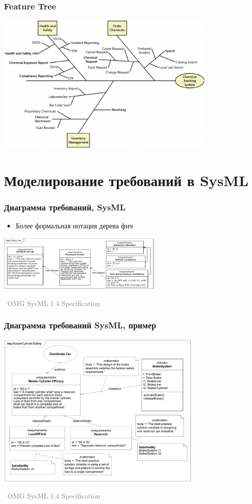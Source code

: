 \documentclass[xetex,mathserif,serif]{beamer}
\newcommand{\attribution}[1] {
	\vspace{-5mm}\begin{flushright}\begin{scriptsize}\textcolor{gray}{\textcopyright\, #1}\end{scriptsize}\end{flushright}
}
\begin{document}
	\begin{frame}
		\frametitle{Feature Tree}
		\begin{center}
			\includegraphics[width=0.8\textwidth]{featureTree.png}
		\end{center}
	\end{frame}

	\section{Моделирование требований в SysML}

	\begin{frame}
		\frametitle{Диаграмма требований, SysML}
		\begin{itemize}
			\item Более формальная нотация дерева фич
		\end{itemize}
		\begin{center}
			\includegraphics[width=0.6\textwidth]{sysMlRequirementDiagram.png}
			\attribution{OMG SysML 1.4 Specification}
		\end{center}
	\end{frame}

	\begin{frame}
		\frametitle{Диаграмма требований SysML, пример}
		\begin{center}
			\includegraphics[width=0.75\textwidth]{sysMlRequirementsExample.png}
			\attribution{OMG SysML 1.4 Specification}
		\end{center}
	\end{frame}
\end{document}

